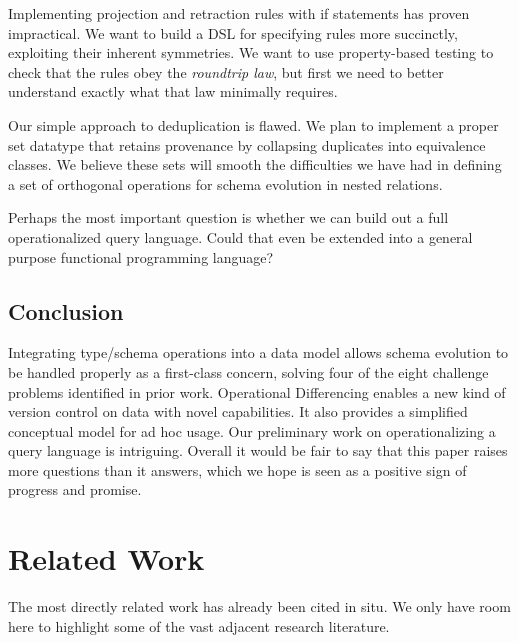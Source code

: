 \documentclass[english,submission]{programming}
\theoremstyle{definition}
\begin{document}
Implementing projection and retraction rules with if statements has proven impractical. We want to build a DSL for specifying rules more succinctly, exploiting their inherent symmetries.
We want to use property-based testing to check that the rules obey the \textit{roundtrip law}, but first we need to better understand exactly what that law minimally requires.

Our simple approach to deduplication is flawed. We plan to implement a proper set datatype that retains provenance by collapsing duplicates into equivalence classes. We believe these sets will smooth the difficulties we have had in defining a set of orthogonal operations for schema evolution in nested relations.

Perhaps the most important question is whether we can build out a full operationalized query language. Could that even be extended into a general purpose functional programming language?


\subsection{Conclusion}

Integrating type/schema operations into a data model allows schema evolution to be handled properly as a first-class concern,
solving four of the eight challenge problems identified in prior work.
Operational Differencing enables a new kind of version control on data with novel capabilities. It also provides a simplified conceptual model for ad hoc usage.
Our preliminary work on operationalizing a query language is intriguing.
Overall it would be fair to say that this paper raises more questions than it answers, which we hope is seen as a positive sign of progress and promise.



\section{Related Work}

The most directly related work has already been cited in situ.
We only have room here to highlight some of the vast adjacent research literature.
\end{document}
